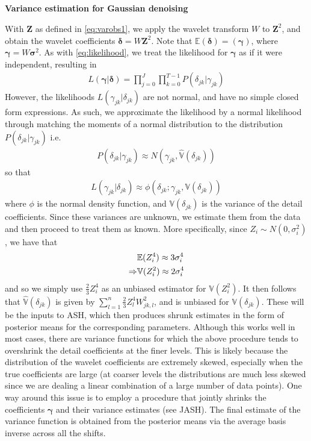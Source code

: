 \documentclass[12pt]{article}
\newcommand{\Gg}{\gamma}     \newcommand{\GG}{\Gamma}
\newcommand{\Gd}{\delta}     \newcommand{\GD}{\Delta}
\newcommand{\s}{\sigma}
\begin{document}
\begin{appendices}
\section{}\label{app:var estimation}\bigskip
\textbf{Variance estimation for Gaussian denoising}

With $\bm{Z}$ as defined in \eqref{eq:varobs1}, we apply the wavelet transform $W$ to $\bm{Z}^2$, and obtain the wavelet coefficients $\bm{\Gd}=W\bm{Z}^2$. Note that $\mathbb{E}(\bm{\Gd})=(\bm{\Gg})$, where $\bm{\Gg}=W\bm{\s}^2$. As with \eqref{eq:likelihood}, we treat the likelihood for $\bm{\Gg}$ as if it were independent, resulting in
\begin{eqnarray}
L(\bm{\Gg}|\bm{\Gd})=\prod_{j=0}^J\prod_{k=0}^{T-1}P(\Gd_{jk}|\Gg_{jk})
\end{eqnarray}
However, the likelihoods $L(\Gg_{jk}|\Gd_{jk})$ are not normal, and have no simple closed form expressions. As such, we approximate the likelihood by a normal likelihood through matching the moments of a normal distribution to the distribution $P(\Gd_{jk}|\Gg_{jk})$ i.e.
\begin{eqnarray}
P(\Gd_{jk}|\Gg_{jk})\approx N(\Gg_{jk},\hat{\mathbb{V}}(\Gd_{jk}))
\end{eqnarray}
so that
\begin{eqnarray}\label{eq:gaus approx}
L(\Gg_{jk}|\Gd_{jk})\approx \phi(\Gd_{jk};\Gg_{jk},\mathbb{V}(\Gd_{jk}))
\end{eqnarray}
where $\phi$ is the normal density function, and $\mathbb{V}(\Gd_{jk})$ is the variance of the detail coefficients. Since these variances are unknown, we estimate them from the data and then proceed to treat them as known. More specifically, since $Z_i\sim N(0,\s_i^2)$, we have that
\begin{eqnarray}
&\mathbb{E}(Z_i^4)\approx 3\s_i^4\notag\\
\label{eq:varvarest}\Rightarrow&\mathbb{V}(Z_i^2)\approx 2\s_i^4
\end{eqnarray}
and so we simply use $\frac{2}{3}Z_i^4$ as an unbiased estimator for $\mathbb{V}(Z_i^2)$. It then follows that $\hat{\mathbb{V}}(\Gd_{jk})$ is given by $\sum_{l=1}^n \frac{2}{3}Z_l^4W_{jk,l}^2$, and is unbiased for $\mathbb{V}(\Gd_{jk})$. These will be the inputs to ASH, which then produces shrunk estimates in the form of posterior means for the corresponding parameters. Although this works well in most cases, there are variance functions for which the above procedure tends to overshrink the detail coefficients at the finer levels. This is likely because the distribution of the wavelet coefficients are extremely skewed, especially when the true coefficients are large (at coarser levels the distributions are much less skewed since we are dealing a linear combination of a large number of data points). One way around this issue is to employ a procedure that jointly shrinks the coefficients $\bm{\Gg}$ and their variance estimates (see JASH). The final estimate of the variance function is obtained from the posterior means via the average basis inverse across all the shifts.


\end{appendices}
\end{document}
